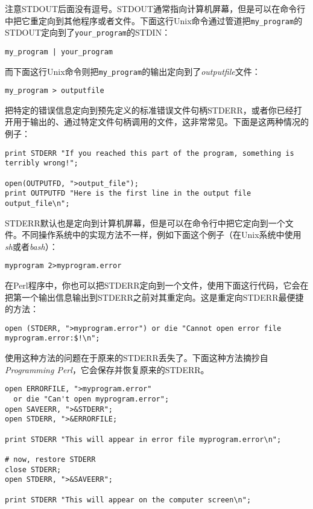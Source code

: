 注意STDOUT后面没有逗号。STDOUT通常指向计算机屏幕，但是可以在命令行中把它重定向到其他程序或者文件。下面这行Unix命令通过管道把\verb|my_program|的STDOUT定向到了\verb|your_program|的STDIN：

\begin{lstlisting}
my_program | your_program 
\end{lstlisting} 

而下面这行Unix命令则把\verb|my_program|的输出定向到了\textit{outputfile}文件：

\begin{lstlisting}
my_program > outputfile
\end{lstlisting}

把特定的错误信息定向到预先定义的标准错误文件句柄STDERR，或者你已经打开用于输出的、通过特定文件句柄调用的文件，这非常常见。下面是这两种情况的例子：

\begin{lstlisting}
print STDERR "If you reached this part of the program, something is terribly wrong!";

open(OUTPUTFD, ">output_file");
print OUTPUTFD "Here is the first line in the output file output_file\n";
\end{lstlisting}

STDERR默认也是定向到计算机屏幕，但是可以在命令行中把它定向到一个文件。不同操作系统中的实现方法不一样，例如下面这个例子（在Unix系统中使用\textit{sh}或者\textit{bash}）：

\begin{lstlisting}
myprogram 2>myprogram.error
\end{lstlisting}

在Perl程序中，你也可以把STDERR定向到一个文件，使用下面这行代码，它会在把第一个输出信息输出到STDERR之前对其重定向。这是重定向STDERR最便捷的方法：

\begin{lstlisting}
open (STDERR, ">myprogram.error") or die "Cannot open error file myprogram.error:$!\n";
\end{lstlisting}

使用这种方法的问题在于原来的STDERR丢失了。下面这种方法摘抄自\textit{Programming Perl}，它会保存并恢复原来的STDERR。

\begin{lstlisting}
open ERRORFILE, ">myprogram.error" 
  or die "Can't open myprogram.error";
open SAVEERR, ">&STDERR";
open STDERR, ">&ERRORFILE;

print STDERR "This will appear in error file myprogram.error\n";

# now, restore STDERR 
close STDERR;
open STDERR, ">&SAVEERR";

print STDERR "This will appear on the computer screen\n";
\end{lstlisting}


